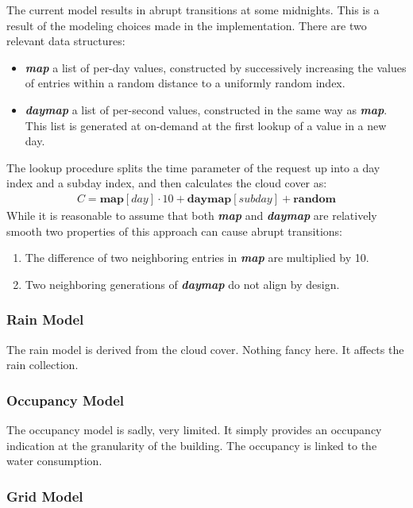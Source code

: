 \documentclass[10pt]{article}
\newcommand{\textdesc}[1]{\textit{\textbf{#1}}} %
\newcommand{\descitem}[1]{\item \textdesc{#1}}
\begin{document}
The current model results in abrupt transitions at some midnights. This is a result of the modeling choices made in the implementation. There are two relevant data structures:
\begin{itemize}
  \descitem{map} a list of per-day values, constructed by successively increasing the values of entries within a random distance to a uniformly random index.
  \descitem{daymap} a list of per-second values, constructed in the same way as \textdesc{map}. This list is generated at on-demand at the first lookup of a value in a new day.
\end{itemize}
The lookup procedure splits the time parameter of the request up into a day index and a subday index, and then calculates the cloud cover as:
\begin{eqnarray}
\nonumber C = \mathbf{map}[day] \cdot 10+\mathbf{daymap}[subday]+\mathbf{random}
\end{eqnarray}
While it is reasonable to assume that both \textdesc{map} and \textdesc{daymap} are relatively smooth two properties of this approach can cause abrupt transitions:
\begin{enumerate}
  \item The difference of two neighboring entries in \textdesc{map} are multiplied by 10.
  \item Two neighboring generations of \textdesc{daymap} do not align by design.
\end{enumerate}

\subsubsection{Rain Model}
\label{sec:internals:models:rain}

The rain model is derived from the cloud cover. Nothing fancy here. It affects the rain collection.

\subsubsection{Occupancy Model}
\label{sec:internals:models:occupancy}

The occupancy model is sadly, very limited. It simply provides an occupancy indication at the granularity of the building. The occupancy is linked to the water consumption.

\subsubsection{Grid Model}
\label{sec:internals:models:grid}
\end{document}
